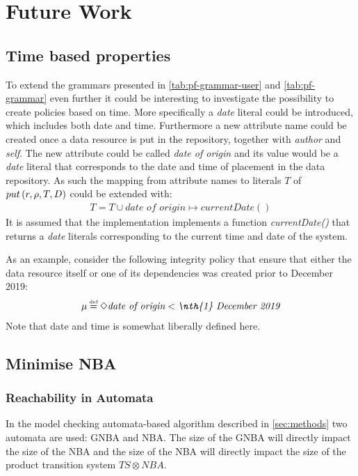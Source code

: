 \section{Future Work}\label{sec:future-work}
\subsection{Time based properties}
To extend the grammars presented in \autoref{tab:pf-grammar-user} and \autoref{tab:pf-grammar} even further it could be interesting to investigate the possibility to create policies based on time. More specifically a \emph{date} literal could be introduced, which includes both date and time. Furthermore a new attribute name could be created once a data resource is put in the repository, together with \emph{author} and \emph{self}. The new attribute could be called \emph{date of origin} and its value would be a \emph{date} literal that corresponds to the date and time of placement in the data repository. As such the mapping from attribute names to literals $T$ of $put \left( r, \rho, T, D \right)$ could be extended with:
\begin{align*}
    T = T \cup \textit{date of origin} \mapsto currentDate()
\end{align*}
It is assumed that the implementation implements a function \emph{currentDate()} that returns a \emph{date} literals corresponding to the current time and date of the system.

As an example, consider the following integrity policy that ensure that either the data resource itself or one of its dependencies was created prior to  December 2019:
\begin{align*}
    \inte \eqdef \F \textit{date of origin} < \textit{\nth{1} December 2019}
\end{align*}
Note that date and time is somewhat liberally defined here.

\subsection{Minimise NBA}
\subsubsection{Reachability in Automata}\label{sec:reach}
In the model checking automata-based algorithm described in \autoref{sec:methods} two automata are used: GNBA and NBA. The size of the GNBA will directly impact the size of the NBA and the size of the NBA will directly impact the size of the product transition system $TS \otimes NBA$. 

